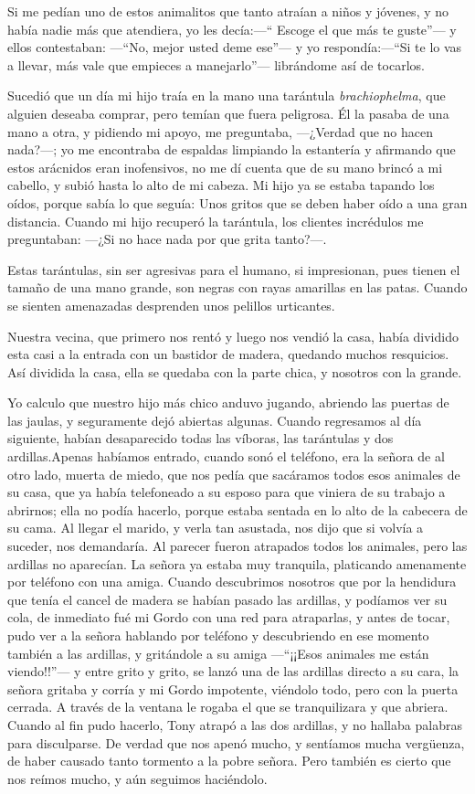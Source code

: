 \documentclass[letterpaper, 12pt]{book}
\begin{document}
Si me pedían uno de estos animalitos que tanto atraían a niños y jóvenes, y no había nadie más que atendiera, yo les decía:---`` Escoge el que más te guste''--- y ellos contestaban: ---``No, mejor usted deme ese''--- y yo respondía:---``Si te lo vas a llevar, más vale que empieces a manejarlo''--- librándome así de tocarlos.


Sucedió que un día mi hijo traía en la mano una tarántula \textit{brachiophelma}, que alguien deseaba comprar, pero temían que fuera peligrosa. Él la pasaba de una mano a otra, y pidiendo mi apoyo, me preguntaba, ---¿Verdad que no hacen nada?---; yo me encontraba de espaldas limpiando la estantería y afirmando que estos arácnidos eran inofensivos, no me dí cuenta que de su mano brincó a mi cabello, y subió hasta lo alto de mi cabeza. Mi hijo ya se estaba tapando los oídos, porque sabía lo que seguía: Unos gritos que se deben haber oído a una gran distancia. Cuando mi hijo recuperó la tarántula, los clientes incrédulos me preguntaban: ---¿Si no hace nada por que grita tanto?---.

Estas tarántulas, sin ser agresivas para el humano, si impresionan, pues tienen el tamaño de una mano grande, son negras con rayas amarillas en las patas. Cuando se sienten amenazadas desprenden unos pelillos urticantes.

Nuestra vecina, que primero nos rentó y luego nos vendió la casa, había dividido esta casi a la entrada con un bastidor de madera, quedando muchos resquicios. Así dividida la  casa, ella se quedaba con la parte chica, y nosotros con la grande.

Yo calculo que nuestro hijo más chico anduvo jugando, abriendo las puertas de las jaulas, y seguramente dejó abiertas algunas. Cuando regresamos al día siguiente, habían desaparecido todas las víboras, las tarántulas y dos ardillas.Apenas habíamos entrado, cuando sonó el teléfono, era la señora de al otro lado, muerta de miedo, que nos pedía que sacáramos todos esos animales de su casa, que ya había telefoneado a su esposo para que viniera de su trabajo a abrirnos; ella no podía hacerlo, porque estaba sentada en lo alto de la cabecera de su cama. Al llegar el marido, y verla tan asustada, nos dijo que si volvía a suceder, nos demandaría. Al parecer fueron atrapados todos los animales, pero las ardillas no aparecían. La señora ya estaba muy tranquila, platicando amenamente  por teléfono con una amiga. Cuando descubrimos nosotros que por la hendidura que tenía el cancel de madera se habían pasado las ardillas, y podíamos ver su cola, de inmediato fué mi Gordo con una red para atraparlas, y antes de tocar, pudo ver a la señora hablando por teléfono y descubriendo en ese momento también a las ardillas, y gritándole a su amiga ---``¡¡Esos animales me están viendo!!''--- y entre grito y grito, se lanzó una de las ardillas directo a su cara, la señora gritaba y corría y mi Gordo impotente, viéndolo todo, pero con la puerta cerrada. A través de la ventana le rogaba el que se tranquilizara y que abriera. Cuando al fin pudo hacerlo, Tony atrapó a las dos ardillas, y no hallaba palabras para disculparse. De verdad que nos apenó mucho, y sentíamos mucha vergüenza, de haber causado tanto tormento a la pobre señora. Pero también  es cierto que nos reímos mucho, y aún seguimos haciéndolo.
\end{document}
